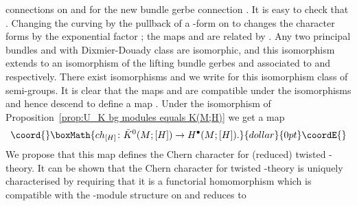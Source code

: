 \documentclass[a4paper,reqno]{amsart}
\theoremstyle{plain}
\theoremstyle{definition}
\theoremstyle{remark}
\numberwithin{equation}{section}
\numberwithin{figure}{section}
\providecommand{\<}{\langle}
\renewcommand{\>}{\rangle}
\begin{document}
connections on \coordHE{} and \coordHE{} for the new bundle gerbe 
connection \coordHE{}.  It is easy 
to check that \coordHE{}.  
Changing the curving \coordHE{} by 
the pullback of a \coordHE{}-form \myHighlight{$\lambda$}\coordHE{} on \coordHE{} to \coordHE{} 
changes the character forms by the exponential 
factor \myHighlight{$\exp(\lambda)$}\coordHE{}; the maps \coordHE{} and 
\coordHE{} are related by 
\coordHE{}.  
Any two principal \coordHE{} bundles 
\coordHE{} and \coordHE{} with Dixmier-Douady class \myHighlight{$[H]$}\coordHE{} are isomorphic, 
and this isomorphism extends to an isomorphism of 
the lifting bundle gerbes \coordHE{} and \coordHE{} 
associated to \coordHE{} and \coordHE{} respectively.   
There exist isomorphisms \coordHE{} and we write \coordHE{} 
for this isomorphism class of semi-groups.  It is 
clear that the maps \coordHE{} 
and \coordHE{} 
are compatible under the isomorphisms \coordHE{} and hence descend to define a map 
\coordHE{}.  
Under the isomorphism \coordHE{} of 
Proposition~\ref{prop:U_K bg modules equals K(M;H)} we 
get a map 
$$\coord{}\boxMath{
ch_{[H]}\colon \tilde{K}^0(M;[H])\to 
H^\bullet(M;[H]).
}{dollar}{0pt}\coordE{}$$
We propose that this map 
defines the Chern character for (reduced) twisted 
\coordHE{}-theory.  It can be shown that the 
Chern character for twisted \coordHE{}-theory 
is uniquely characterised by requiring that 
it is a functorial homomorphism which is compatible 
with the \coordHE{}-module 
structure on \coordHE{} and reduces to 
\end{document}
